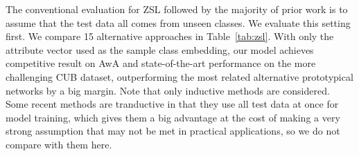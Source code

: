 \documentclass[10pt,twocolumn,letterpaper]{article}
\begin{document}
The conventional evaluation for ZSL followed by the majority of prior work is to assume that the test data all comes from unseen classes. We evaluate this setting first. 
We compare 15 alternative approaches in Table~\ref{tab:zsl}. With only the attribute vector used as the sample class embedding, our model achieves competitive result on AwA and state-of-the-art performance on the more challenging CUB dataset, outperforming the most related alternative prototypical networks \cite{snell2017prototypical} by a big margin.
Note that only inductive methods are considered. Some recent methods \cite{zhang2016zeroshot, fu2014transductive, fu2016semi} are tranductive in that they use all test data at once for model training, which gives them a big advantage at the cost of making a very strong assumption that may not be met in practical applications, so we do not compare with them here.
\end{document}
